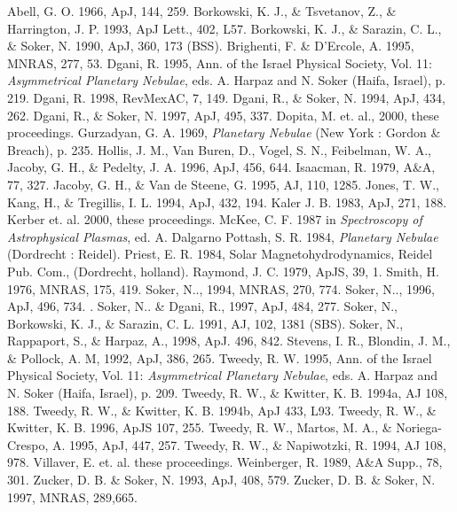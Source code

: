 \begin{references}
 Abell, G. O. 1966, ApJ, 144, 259.
 Borkowski, K. J., \& Tsvetanov, Z., \& Harrington, J. P. 1993,
ApJ Lett., 402, L57.
 Borkowski, K. J., \& Sarazin, C. L., \& Soker, N. 1990,
ApJ, 360, 173 (BSS).
 Brighenti, F. \& D'Ercole, A. 1995, MNRAS, 277, 53.
 Dgani, R. 1995,
Ann. of the Israel Physical Society, Vol. 11:
{\it Asymmetrical Planetary Nebulae},
eds. A. Harpaz and N. Soker (Haifa, Israel), p. 219.
 Dgani, R. 1998, RevMexAC, 7, 149.
 Dgani, R.,  \& Soker, N. 1994, ApJ, 434, 262.
 Dgani, R.,  \& Soker, N. 1997, ApJ, 495, 337.
 Dopita, M. et. al., 2000, these proceedings.
 Gurzadyan, G. A. 1969, {\it Planetary Nebulae}
(New York : Gordon \& Breach), p. 235.
 Hollis, J. M., Van Buren, D., Vogel, S. N., Feibelman, W. A.,
     Jacoby, G. H., \& Pedelty, J. A. 1996, ApJ, 456, 644.
 Isaacman,  R. 1979, A\&A, 77, 327.
 Jacoby, G. H., \& Van de Steene, G. 1995, AJ, 110, 1285.
 Jones, T. W., Kang, H., \& Tregillis, I. L. 1994,
ApJ, 432, 194.
 Kaler J. B. 1983, ApJ, 271, 188.
 Kerber et. al. 2000, these proceedings.
 McKee, C. F. 1987 in {\it Spectroscopy of Astrophysical
 Plasmas}, ed. A. Dalgarno
 Pottash, S. R. 1984,  {\it Planetary Nebulae} (Dordrecht : Reidel).
 Priest, E. R. 1984, Solar Magnetohydrodynamics,
Reidel Pub. Com., (Dordrecht, holland).
 Raymond,  J. C.  1979, ApJS, 39, 1.
 Smith, H.  1976, MNRAS, 175, 419.
 Soker, N.., 1994, MNRAS, 270, 774.
 Soker, N.., 1996, ApJ, 496, 734. .
 Soker, N.. \&   Dgani, R., 1997, ApJ, 484, 277.
 Soker, N., Borkowski, K. J., \& Sarazin, C. L. 1991, AJ, 102, 1381 (SBS).
 Soker, N., Rappaport, S., \& Harpaz, A., 1998, ApJ. 496, 842.
 Stevens, I. R., Blondin, J. M., \& Pollock, A. M, 1992, ApJ, 386, 265.
 Tweedy, R. W. 1995,
Ann. of the Israel Physical Society, Vol. 11:
{\it Asymmetrical Planetary Nebulae},
eds. A. Harpaz and N. Soker (Haifa, Israel), p. 209.
 Tweedy, R. W., \& Kwitter, K. B. 1994a, AJ 108, 188.
 Tweedy, R. W., \& Kwitter, K. B. 1994b, ApJ 433, L93.
 Tweedy, R. W., \& Kwitter, K. B. 1996, ApJS 107, 255.
 Tweedy, R. W., Martos, M. A., \& Noriega-Crespo, A. 1995,
ApJ, 447, 257.
 Tweedy, R. W., \& Napiwotzki, R. 1994, AJ 108, 978.
 Villaver, E. et. al. these proceedings.
 Weinberger, R.  1989, A\&A Supp., 78, 301.
 Zucker, D. B. \& Soker, N. 1993, ApJ, 408, 579.
 Zucker, D. B. \& Soker, N. 1997, MNRAS, 289,665.
\end{references}


